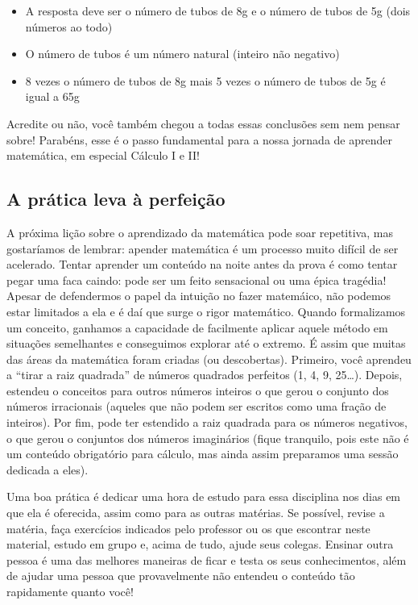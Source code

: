 \documentclass[
  letterpaper,
  DIV=11,
  numbers=noendperiod]{scrreprt}
\providecommand{\tightlist}{%
  \setlength{\itemsep}{0pt}\setlength{\parskip}{0pt}}\usepackage{longtable,booktabs,array}
\begin{document}
\begin{itemize}
\tightlist
\item
  A resposta deve ser o número de tubos de 8g e o número de tubos de 5g
  (dois números ao todo)
\item
  O número de tubos é um número natural (inteiro não negativo)
\item
  8 vezes o número de tubos de 8g mais 5 vezes o número de tubos de 5g é
  igual a 65g
\end{itemize}

Acredite ou não, você também chegou a todas essas conclusões sem nem
pensar sobre! Parabéns, esse é o passo fundamental para a nossa jornada
de aprender matemática, em especial Cálculo I e II!

\subsection{A prática leva à
perfeição}\label{a-pruxe1tica-leva-uxe0-perfeiuxe7uxe3o}

A próxima lição sobre o aprendizado da matemática pode soar repetitiva,
mas gostaríamos de lembrar: apender matemática é um processo muito
difícil de ser acelerado. Tentar aprender um conteúdo na noite antes da
prova é como tentar pegar uma faca caindo: pode ser um feito sensacional
ou uma épica tragédia! Apesar de defendermos o papel da intuição no
fazer matemáico, não podemos estar limitados a ela e é daí que surge o
rigor matemático. Quando formalizamos um conceito, ganhamos a capacidade
de facilmente aplicar aquele método em situações semelhantes e
conseguimos explorar até o extremo. É assim que muitas das áreas da
matemática foram criadas (ou descobertas). Primeiro, você aprendeu a
``tirar a raiz quadrada'' de números quadrados perfeitos (1, 4, 9,
25\ldots). Depois, estendeu o conceitos para outros números inteiros o
que gerou o conjunto dos números irracionais (aqueles que não podem ser
escritos como uma fração de inteiros). Por fim, pode ter estendido a
raiz quadrada para os números negativos, o que gerou o conjuntos dos
números imaginários (fique tranquilo, pois este não é um conteúdo
obrigatório para cálculo, mas ainda assim preparamos uma sessão dedicada
a eles).

Uma boa prática é dedicar uma hora de estudo para essa disciplina nos
dias em que ela é oferecida, assim como para as outras matérias. Se
possível, revise a matéria, faça exercícios indicados pelo professor ou
os que escontrar neste material, estudo em grupo e, acima de tudo, ajude
seus colegas. Ensinar outra pessoa é uma das melhores maneiras de ficar
e testa os seus conhecimentos, além de ajudar uma pessoa que
provavelmente não entendeu o conteúdo tão rapidamente quanto você!
\end{document}
